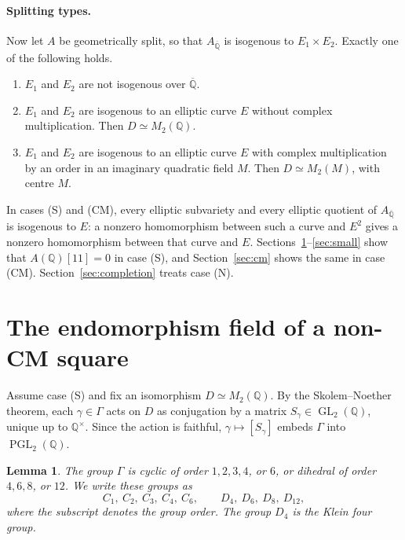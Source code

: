 \documentclass[11pt]{article}
\newtheorem{lemma}{Lemma}
\theoremstyle{remark}
\newcommand{\Q}{\mathbb Q}
\DeclareMathOperator{\GL}{GL}
\DeclareMathOperator{\PGL}{PGL}
\begin{document}
\paragraph{Splitting types.}
Now let \(A\) be geometrically split, so that
\(A_{\overline{\Q}}\) is isogenous to \(E_1\times E_2\). Exactly one
of the following holds.
\begin{enumerate}
\item[(N)] \(E_1\) and \(E_2\) are not isogenous over \(\overline{\Q}\).
\item[(S)] \(E_1\) and \(E_2\) are isogenous to an elliptic curve \(E\)
without complex multiplication. Then \(D\simeq M_2(\Q)\).
\item[(CM)] \(E_1\) and \(E_2\) are isogenous to an elliptic curve
\(E\) with complex multiplication by an order in an imaginary
quadratic field \(M\). Then \(D\simeq M_2(M)\), with centre \(M\).
\end{enumerate}
In cases (S) and (CM), every elliptic subvariety and every elliptic
quotient of \(A_{\overline{\Q}}\) is isogenous to \(E\): a nonzero
homomorphism between such a curve and \(E^2\) gives a nonzero
homomorphism between that curve and \(E\).
Sections~\ref{sec:endomorphism-field}--\ref{sec:small} show that
\(A(\Q)[11]=0\) in case (S), and Section~\ref{sec:cm} shows the same in
case (CM). Section~\ref{sec:completion} treats case (N).

\section{The endomorphism field of a non-CM square}\label{sec:endomorphism-field}

Assume case (S) and fix an isomorphism \(D\simeq M_2(\Q)\). By the
Skolem--Noether theorem, each \(\gamma\in\Gamma\) acts on \(D\) as
conjugation by a matrix \(S_\gamma\in\GL_2(\Q)\), unique up to
\(\Q^\times\). Since the action is faithful, \(\gamma\mapsto[S_\gamma]\)
embeds \(\Gamma\) into \(\PGL_2(\Q)\).

\begin{lemma}\label{lem:finite-subgroups}
The group \(\Gamma\) is cyclic of order \(1,2,3,4\), or \(6\), or
dihedral of order \(4,6,8\), or \(12\). We write these groups as
\[
 C_1,\ C_2,\ C_3,\ C_4,\ C_6,\qquad D_4,\ D_6,\ D_8,\ D_{12},
\]
where the subscript denotes the group order. The group \(D_4\) is the
Klein four group.
\end{lemma}
\end{document}
